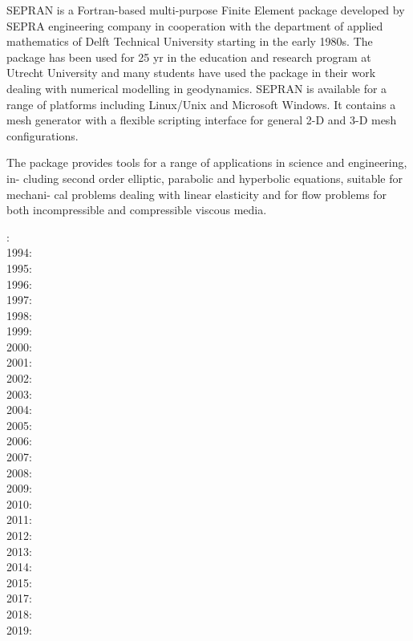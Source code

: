 \begin{itemize}
SEPRAN \cite{sepr05} is a Fortran-based
multi-purpose Finite Element package developed by SEPRA engineering company in
cooperation with the department of applied mathematics of Delft Technical University
starting in the early 1980s. The package has been used for 25 yr in the education and
research program at Utrecht University and many students have used the package in
their work dealing with numerical modelling in geodynamics. SEPRAN is available for
a range of platforms including Linux/Unix and Microsoft Windows. It contains a mesh
generator with a flexible scripting interface for general 2-D and 3-D mesh configurations.

The package provides tools for a range of applications in science and engineering, in-
cluding second order elliptic, parabolic and hyperbolic equations, suitable for mechani-
cal problems dealing with linear elasticity and for flow problems for both incompressible
and compressible viscous media.

{\small
{}: \cite{beky93}\cite{vavy93}\\
1994: \cite{vlvv94}\cite{vayv94}\\
1995: \cite{vayv95}\cite{vayu95}\\
1996: \cite{vayu96}\\
1997: \cite{vayu97}\cite{vank97}\\
1998: \cite{devv98}\\
1999: \cite{devv99}\\
2000: \cite{devv00b}\cite{vavv00}\\
2001: \cite{drvc01}\cite{vavv01}\\
2002: \cite{civv02}\cite{vavv02}\cite{vakp02}\cite{vavv02b}\cite{vaya02}\\
2003: \cite{vavd03}\cite{vabh03}\\
2004: \cite{vavv04}\cite{vavv04b}\cite{vavv04c}\cite{vayr04}\cite{vavv04d}\\
2005: \cite{vavv05}\cite{sepr05}\cite{vary05}\\
2006: \cite{liva06a}\cite{liva06b}\\
2007: \cite{vant07}\cite{civv07}\cite{brva07a}\cite{brva07b}\cite{knvk07}\\
2008: \cite{plva08}\cite{brhv08}\cite{knva08}\cite{vava08}\\
2009: \cite{vavl09}\cite{vavv09}\\
2010: \cite{vahy10}\cite{syva10}\cite{devv10}\cite{vady10}\cite{vayb10}\\
2011: \cite{vahs11}\cite{java11}\cite{vayj11}\\
2012: \cite{besy12}\cite{beva12}\cite{chgv12}\\
2013: \cite{ancv13}\\
2014: \cite{chsg14}\cite{mova14}\cite{chsv14}\\
2015: \cite{vasy15}\\
2017: \cite{civj17}\cite{wewv17}\\
2018: \cite{spcv18}\cite{chss18}\\
2019: \cite{zhdv19}\cite{vayu19}\cite{casv19}\cite{vaws19}
}


\end{itemize}
